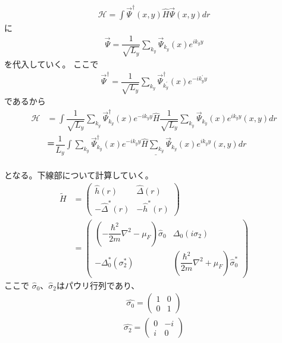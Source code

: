 \documentclass{jarticle}
\begin{document}
	    \begin{align}
	   \mathcal{H}=\int\vec{\Psi}^\dagger(x,y)\hat{H}\vec{\Psi}(x,y)dr
	   \end{align}
	   に
	  \begin{align}
	   \vec{\Psi}=\dfrac{1}{\sqrt{L_y}}\displaystyle\sum_{k_y}\vec{\Psi}_{k_y}(x)e^{ik_yy}
	  \end{align}
	  を代入していく。
	  ここで
	  \begin{align}
	  \vec{\Psi}^\dagger=\dfrac{1}{\sqrt{L_y}}\displaystyle\sum_{k_y}\vec{\Psi}^\dagger_{k_y^{'}}(x)e^{-ik_y^{'}y}
	  \end{align}
	  であるから
	   \begin{align}
	  \mathcal{H}&=\int\dfrac{1}{\sqrt{L_y}}\displaystyle\sum_{k_y}\vec{\Psi}^\dagger_{k_y}(x)e^{-ik_yy}\hat{H}\dfrac{1}{\sqrt{L_y}}\displaystyle\sum_{k_y}\vec{\Psi}_{k_y}(x)e^{ik_yy}(x,y)dr\\&＝\dfrac{1}{L_y}\underline{\int\displaystyle\sum_{k_y}\vec{\Psi}^\dagger_{k_y}(x)e^{-ik_yy}\hat{H}\displaystyle\sum_{k_y}\vec{\Psi}_{k_y}(x)e^{ik_yy}(x,y)dr}
	  \label{star}
	  \end{align}
	   \\となる。下線部について計算していく。
  \begin{align}
  \tilde{H}&=
  \begin{pmatrix}
  \hat{h}(r) & \hat{\Delta}(r) \\
  -\hat{\Delta}^{*}(r) & -\hat{h}^{*}(r)
  \end{pmatrix}
   \\&=
     \begin{pmatrix}
   (-\dfrac{\hbar^2}{2m}\nabla^2-\mu_F)\hat{\sigma}_0 & \Delta_0(i\sigma_2) \\
   -\Delta^{*}_0(\sigma^{*}_2) & (\dfrac{\hbar^2}{2m}\nabla^2+\mu_F)\hat{\sigma}^{*}_0
   \end{pmatrix}
  \end{align}
  ここで
  $\hat\sigma_0$、$\hat\sigma_2$はパウリ行列であり、
  \begin{align}
  \hat{\sigma_0}=
  \begin{pmatrix}
  1 & 0 \\
  0 & 1
  \end{pmatrix}
  \end{align}
  \begin{align}
  \hat{\sigma_2}=
  \begin{pmatrix}
  0 & -i \\
  i & 0
  \end{pmatrix}
  \end{align}
\end{document}
